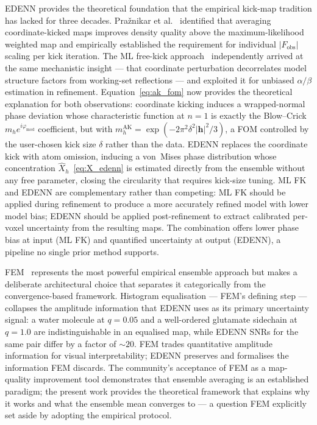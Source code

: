 \documentclass[10pt,twocolumn]{article}
\newcommand{\phimod}{\varphi_{\mathrm{mod}}}
\newcommand{\boldh}{\mathbf{h}}
\begin{document}
EDENN provides the theoretical foundation that the empirical
kick-map tradition has lacked for three decades.
Pra\v{z}nikar et al.~\cite{praznk2009} identified that averaging
coordinate-kicked maps improves density quality above the
maximum-likelihood weighted map and empirically established the
requirement for individual $|F_\mathrm{obs}|$ scaling per kick
iteration.
The ML free-kick approach~\cite{praznk2014} independently arrived
at the same mechanistic insight --- that coordinate perturbation
decorrelates model structure factors from working-set reflections
--- and exploited it for unbiased $\alpha/\beta$ estimation in
refinement.
Equation~\eqref{eq:ak_fom} now provides the theoretical explanation
for both observations: coordinate kicking induces a wrapped-normal
phase deviation whose characteristic function at $n=1$ is exactly
the Blow--Crick $m_h e^{i\phimod}$ coefficient, but with
$m_h^\mathrm{AK} = \exp(-2\pi^2\delta^2|\boldh|^2/3)$, a FOM
controlled by the user-chosen kick size $\delta$ rather than the data.
EDENN replaces the coordinate kick with atom omission, inducing
a von~Mises phase distribution whose concentration
$\hat{X}_h$~\eqref{eq:X_edenn} is estimated directly from the
ensemble without any free parameter, closing the circularity that
requires kick-size tuning.
ML FK and EDENN are complementary rather than competing:
ML FK should be applied during refinement to produce a more
accurately refined model with lower model bias; EDENN should
be applied post-refinement to extract calibrated per-voxel
uncertainty from the resulting maps.
The combination offers lower phase bias at input (ML FK) and
quantified uncertainty at output (EDENN), a pipeline no single
prior method supports.

FEM~\cite{afonine2015} represents the most powerful empirical
ensemble approach but makes a deliberate architectural choice that
separates it categorically from the convergence-based framework.
Histogram equalisation --- FEM's defining step --- collapses the
amplitude information that EDENN uses as its primary uncertainty
signal: a water molecule at $q=0.05$ and a well-ordered glutamate
sidechain at $q=1.0$ are indistinguishable in an equalised map,
while EDENN SNRs for the same pair differ by a factor of $\sim 20$.
FEM trades quantitative amplitude information for visual
interpretability; EDENN preserves and formalises the information
FEM discards.
The community's acceptance of FEM as a map-quality improvement tool
demonstrates that ensemble averaging is an established paradigm;
the present work provides the theoretical framework that explains
why it works and what the ensemble mean converges to --- a question
FEM explicitly set aside by adopting the empirical protocol.
\end{document}
